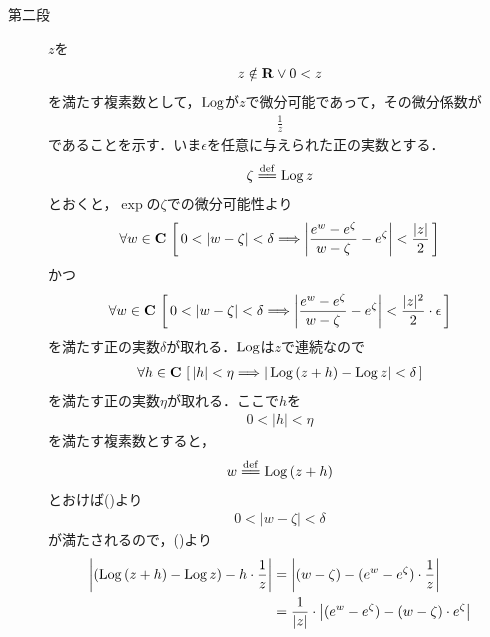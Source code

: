 \begin{sketch}
\begin{description}
			\item[第二段]
				$z$を
				\begin{align}
					z \notin \mathbf{R} \vee 0 < z
				\end{align}
				を満たす複素数として，$\operatorname{Log}$が$z$で微分可能であって，その微分係数が
				\begin{align}
					\frac{1}{z}
				\end{align}
				であることを示す．いま$\epsilon$を任意に与えられた正の実数とする．
				\begin{align}
					\zeta \defeq \pvlog{z}
				\end{align}
				とおくと，$\exp$の$\zeta$での微分可能性より
				\begin{align}
					\forall w \in \mathbf{C}\, 
					\left[\, 0 < |w - \zeta| < \delta
					\Longrightarrow \left|\frac{e^{w} - e^{\zeta}}{w-\zeta} - e^{\zeta}\right| < \frac{|z|}{2}\, \right]
					\label{fom:thm_pv_log_is_holomorphic_2}
				\end{align}
				かつ
				\begin{align}
					\forall w \in \mathbf{C}\, 
					\left[\, 0 < |w - \zeta| < \delta
					\Longrightarrow \left|\frac{e^{w} - e^{\zeta}}{w-\zeta} - e^{\zeta}\right| < \frac{|z|^2}{2} \cdot \epsilon\, \right]
					\label{fom:thm_pv_log_is_holomorphic_3}
				\end{align}
				を満たす正の実数$\delta$が取れる．$\operatorname{Log}$は$z$で連続なので
				\begin{align}
					\forall h \in \mathbf{C}\,
					\left[\, |h| < \eta \Longrightarrow 
					|\operatorname{Log}{(z+h)} - \operatorname{Log}{z}| < \delta\, \right]
					\label{fom:thm_pv_log_is_holomorphic_4}
				\end{align}
				を満たす正の実数$\eta$が取れる．ここで$h$を
				\begin{align}
					0 < |h| < \eta
				\end{align}
				を満たす複素数とすると，
				\begin{align}
					w \defeq \pvlog{(z+h)}
				\end{align}
				とおけば()より
				\begin{align}
					0 < |w - \zeta| < \delta
				\end{align}
				が満たされるので，()より
				\begin{align}
					\left|(\pvlog{(z+h)} - \pvlog{z}) - h \cdot \frac{1}{z}\right|
					&= \left|(w - \zeta) - (e^{w} - e^{\zeta}) \cdot \frac{1}{z}\right| \\
					&= \frac{1}{|z|} \cdot \left|(e^{w} - e^{\zeta}) - (w - \zeta) \cdot e^{\zeta}\right| \\

\end{align}
\end{description}
\end{sketch}
